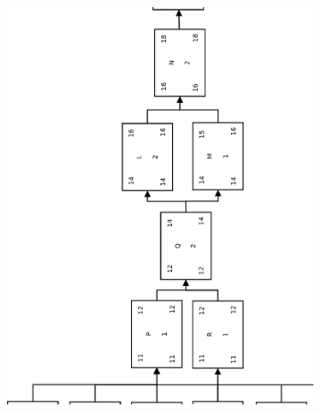 \begin{figure}
    \ContinuedFloat %
    \begin{subfigure}{\textwidth}
        \includegraphics[scale=0.6]{figures/hw5-pdm-2}
    \end{subfigure}
\end{figure}
